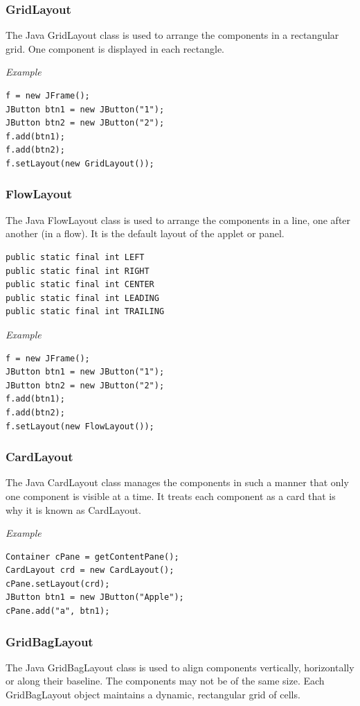 \documentclass[twocolumn, a4paper]{article}
\begin{document}
\subsubsection{GridLayout}
The Java GridLayout class is used to arrange the components in a rectangular
grid. One component is displayed in each rectangle.

\vskip10pt
\noindent\emph{Example}
\begin{lstlisting}
f = new JFrame();
JButton btn1 = new JButton("1");
JButton btn2 = new JButton("2");
f.add(btn1);
f.add(btn2);
f.setLayout(new GridLayout());
\end{lstlisting}

\subsubsection{FlowLayout}
The Java FlowLayout class is used to arrange the components in a line, one
after another (in a flow). It is the default layout of the applet or panel.
\begin{lstlisting}
public static final int LEFT
public static final int RIGHT
public static final int CENTER
public static final int LEADING
public static final int TRAILING
\end{lstlisting}

\vskip10pt
\noindent\emph{Example}
\begin{lstlisting}
f = new JFrame();
JButton btn1 = new JButton("1");
JButton btn2 = new JButton("2");
f.add(btn1);
f.add(btn2);
f.setLayout(new FlowLayout());
\end{lstlisting}

\subsubsection{CardLayout}
The Java CardLayout class manages the components in such a manner that only one
component is visible at a time. It treats each component as a card that is why
it is known as CardLayout.

\vskip10pt
\noindent\emph{Example}
\begin{lstlisting}
Container cPane = getContentPane();
CardLayout crd = new CardLayout();
cPane.setLayout(crd);
JButton btn1 = new JButton("Apple");
cPane.add("a", btn1);
\end{lstlisting}

\subsubsection{GridBagLayout}
The Java GridBagLayout class is used to align components vertically,
horizontally or along their baseline. The components may not be of the same
size. Each GridBagLayout object maintains a dynamic, rectangular grid of cells.
\end{document}
